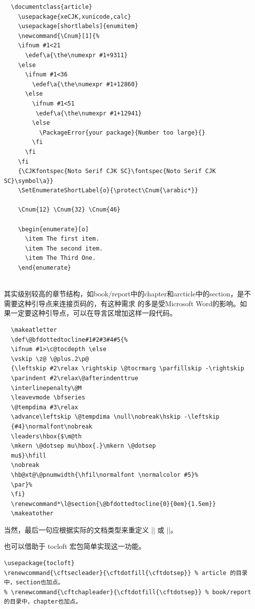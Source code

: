 \begin{verbatim}
  \documentclass{article}
    \usepackage{xeCJK,xunicode,calc}
    \usepackage[shortlabels]{enumitem}
    \newcommand{\Cnum}[1]{%
    \ifnum #1<21
      \edef\a{\the\numexpr #1+9311}
    \else
      \ifnum #1<36
        \edef\a{\the\numexpr #1+12860}
      \else
        \ifnum #1<51
         \edef\a{\the\numexpr #1+12941}
        \else
          \PackageError{your package}{Number too large}{}
        \fi
      \fi
    \fi
    {\CJKfontspec{Noto Serif CJK SC}\fontspec{Noto Serif CJK SC}\symbol\a}}
    \SetEnumerateShortLabel{o}{\protect\Cnum{\arabic*}}
    
    \Cnum{12} \Cnum{32} \Cnum{46} 
    
    \begin{enumerate}[o]
      \item The first item.
      \item The second item.
      \item The Third One.
    \end{enumerate}
    
\end{verbatim}



其实级别较高的章节结构，如book/report中的chapter和arcticle中的section，是不需要这种引导点来连接页码的，有这种需求
的多是受Microsoft Word的影响。如果一定要这种引导点，可以在导言区增加这样一段代码。
\begin{verbatim}
  \makeatletter
  \def\@bfdottedtocline#1#2#3#4#5{%
  \ifnum #1>\c@tocdepth \else
  \vskip \z@ \@plus.2\p@
  {\leftskip #2\relax \rightskip \@tocrmarg \parfillskip -\rightskip
  \parindent #2\relax\@afterindenttrue
  \interlinepenalty\@M
  \leavevmode \bfseries
  \@tempdima #3\relax
  \advance\leftskip \@tempdima \null\nobreak\hskip -\leftskip
  {#4}\normalfont\nobreak
  \leaders\hbox{$\m@th
  \mkern \@dotsep mu\hbox{.}\mkern \@dotsep
  mu$}\hfill
  \nobreak
  \hb@xt@\@pnumwidth{\hfil\normalfont \normalcolor #5}%
  \par}%
  \fi}
  \renewcommand*\l@section{\@bfdottedtocline{0}{0em}{1.5em}}
  \makeatother
\end{verbatim}
当然，最后一句应根据实际的文档类型来重定义 |\l@chapter| 或 |\l@section|。

也可以借助于 tocloft 宏包简单实现这一功能。
\begin{verbatim}
\usepackage{tocloft}
\renewcommand{\cftsecleader}{\cftdotfill{\cftdotsep}} % article 的目录中，section也加点。
% \renewcommand{\cftchapleader}{\cftdotfill{\cftdotsep}} % book/report 的目录中，chapter也加点。
\end{verbatim}


